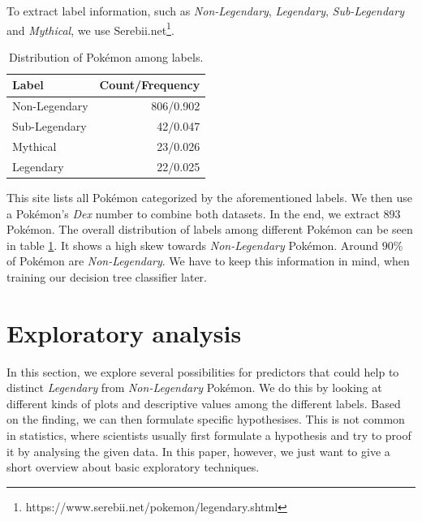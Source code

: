 \documentclass[conference]{IEEEtran}
\begin{document}
To extract label information, such as \textit{Non-Legendary}, \textit{Legendary}, \textit{Sub-Legendary} and \textit{Mythical}, we use Serebii.net\footnote{https://www.serebii.net/pokemon/legendary.shtml}.
\begin{table}[b]
	\centering
	\caption{Distribution of Pokémon among labels.}
	\label{tab:labels}
	\begin{tabular}{lr} \hline
		\textbf{Label} & \textbf{Count/Frequency} \\ \hline
		Non-Legendary  & 806/0.902                \\
		Sub-Legendary  & 42/0.047                 \\
		Mythical       & 23/0.026                 \\
		Legendary      & 22/0.025                 \\ \hline
	\end{tabular}
\end{table}
This site lists all Pokémon categorized by the aforementioned labels. We then use a Pokémon's \textit{Dex} number to combine both datasets. In the end, we extract $893$ Pokémon. The overall distribution of labels among different Pokémon can be seen in table \ref{tab:labels}. It shows a high skew towards \textit{Non-Legendary} Pokémon. Around $90\%$ of Pokémon are \textit{Non-Legendary}. We have to keep this information in mind, when training our decision tree classifier later. 
\section{Exploratory analysis}
In this section, we explore several possibilities for predictors that could help to distinct \textit{Legendary} from \textit{Non-Legendary} Pokémon. We do this by looking at different kinds of plots and descriptive values among the different labels. Based on the finding, we can then formulate specific hypothesises. This is not common in statistics, where scientists usually first formulate a hypothesis and try to proof it by analysing the given data. In this paper, however, we just want to give a short overview about basic exploratory techniques.
\end{document}
